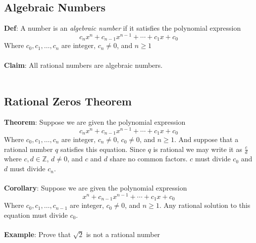 \documentclass{article}
\begin{document}
\pagebreak

\subsection{Algebraic Numbers}
\textbf{Def}: A number is an \emph{algebraic number} if  it satisfies the polynomial expression
$$c_nx^n+c_{n-1}x^{n-1}+\cdots +c_1x+c_0$$
Where $c_0, c_1, \dots, c_n$ are integer, $c_n\neq 0$, and $n\geq 1$
\\\\
\textbf{Claim}: All rational numbers are algebraic numbers.\\\\

\subsection{Rational Zeros Theorem}
\textbf{Theorem}: Suppose we are given the polynomial expression 
$$c_nx^n+c_{n-1}x^{n-1}+\cdots +c_1x+c_0$$
Where $c_0, c_1, \dots, c_n$ are integer, $c_n\neq 0$, $c_0\neq 0$, and $n\geq 1$. And suppose that a rational number $q$ satisfies this equation. Since $q$ is rational we may write it as $\frac{c}{d}$ where $c,d\in \mathbb{Z}$, $d\neq 0$, and $c$ and $d$ share no common factors. $c$ must divide $c_0$ and $d$ must divide $c_n$.
\\\\
\textbf{Corollary}: Suppose we are given the polynomial expression 
$$x^n+c_{n-1}x^{n-1}+\cdots +c_1x+c_0$$
Where $c_0, c_1, \dots, c_{n-1}$ are integer, $c_0\neq 0$, and $n\geq 1$. Any rational solution to this equation must divide $c_0$.
\\\\
\textbf{Example}: Prove that $\sqrt{2}$ is not a rational number
\\\\
\end{document}
